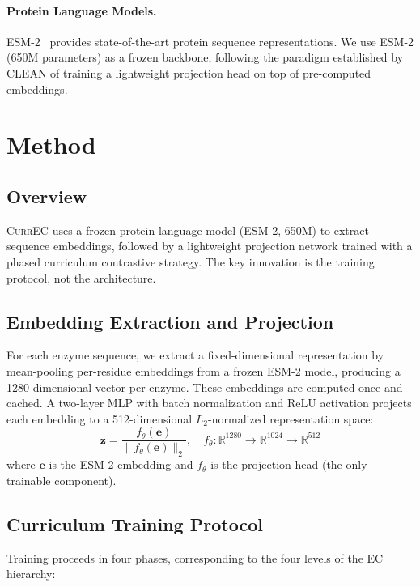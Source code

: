 \documentclass{article}
\newcommand{\currec}{\textsc{CurrEC}}
\begin{document}
\paragraph{Protein Language Models.}
ESM-2~\citep{lin2023evolutionary} provides state-of-the-art protein sequence representations. We use ESM-2 (650M parameters) as a frozen backbone, following the paradigm established by CLEAN of training a lightweight projection head on top of pre-computed embeddings.

\section{Method}\label{sec:method}

\subsection{Overview}

\currec{} uses a frozen protein language model (ESM-2, 650M) to extract sequence embeddings, followed by a lightweight projection network trained with a phased curriculum contrastive strategy. The key innovation is the training protocol, not the architecture.

\subsection{Embedding Extraction and Projection}
For each enzyme sequence, we extract a fixed-dimensional representation by mean-pooling per-residue embeddings from a frozen ESM-2 model, producing a 1280-dimensional vector per enzyme. These embeddings are computed once and cached. A two-layer MLP with batch normalization and ReLU activation projects each embedding to a 512-dimensional $L_2$-normalized representation space:
\begin{equation}
    \mathbf{z} = \frac{f_\theta(\mathbf{e})}{\|f_\theta(\mathbf{e})\|_2}, \quad f_\theta: \mathbb{R}^{1280} \rightarrow \mathbb{R}^{1024} \rightarrow \mathbb{R}^{512}
\end{equation}
where $\mathbf{e}$ is the ESM-2 embedding and $f_\theta$ is the projection head (the only trainable component).

\subsection{Curriculum Training Protocol}

Training proceeds in four phases, corresponding to the four levels of the EC hierarchy:
\end{document}
